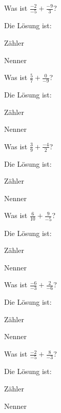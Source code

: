\documentclass{ximera}
\begin{document}
\begin{shuffle}
\begin{question}
Was ist $\frac{-2}{-5} + \frac{-9}{3}$?
\begin{solution}
Die Lösung ist:

Zähler 

Nenner 
\end{solution}
\end{question}


\begin{question}
Was ist $\frac{5}{7} + \frac{0}{-9}$?
\begin{solution}
Die Lösung ist:

Zähler 

Nenner 
\end{solution}
\end{question}


\begin{question}
Was ist $\frac{3}{9} + \frac{-4}{2}$?
\begin{solution}
Die Lösung ist:

Zähler 

Nenner 
\end{solution}
\end{question}


\begin{question}
Was ist $\frac{6}{10} + \frac{9}{-5}$?
\begin{solution}
Die Lösung ist:

Zähler 

Nenner 
\end{solution}
\end{question}


\begin{question}
Was ist $\frac{-6}{-3} + \frac{2}{-6}$?
\begin{solution}
Die Lösung ist:

Zähler 

Nenner 
\end{solution}
\end{question}


\begin{question}
Was ist $\frac{-2}{-5} + \frac{8}{-3}$?
\begin{solution}
Die Lösung ist:

Zähler 

Nenner 
\end{solution}
\end{question}



\end{shuffle}
\end{document}
